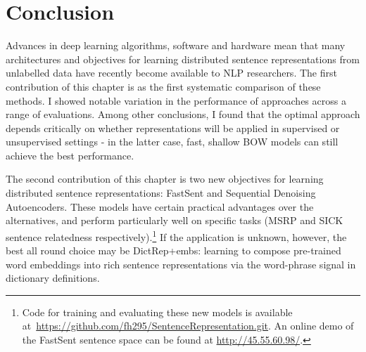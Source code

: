 
\section{Conclusion}

Advances in deep learning algorithms, software and hardware mean that many architectures and objectives for learning distributed sentence representations from unlabelled data have recently become available to NLP researchers. The first contribution of this chapter is as the first systematic comparison of these methods. I showed notable variation in the performance of approaches across a range of evaluations. Among other conclusions, I found that the optimal approach depends critically on whether representations will be applied in supervised or unsupervised settings - in the latter case, fast, shallow BOW models can still achieve the best performance. 

The second contribution of this chapter is two new objectives for learning distributed sentence representations: FastSent and Sequential Denoising Autoencoders. These models have certain practical advantages over the alternatives, and perform particularly well on specific tasks (MSRP and SICK sentence relatedness respectively).\footnote{Code for training and evaluating these new models is available at~\url{https://github.com/fh295/SentenceRepresentation.git}. An online demo of the FastSent sentence space can be found at \url{http://45.55.60.98/}.} If the application is unknown, however, the best all round choice may be DictRep+embs: learning to compose pre-trained word embeddings into rich sentence representations via the word-phrase signal in dictionary definitions. 

